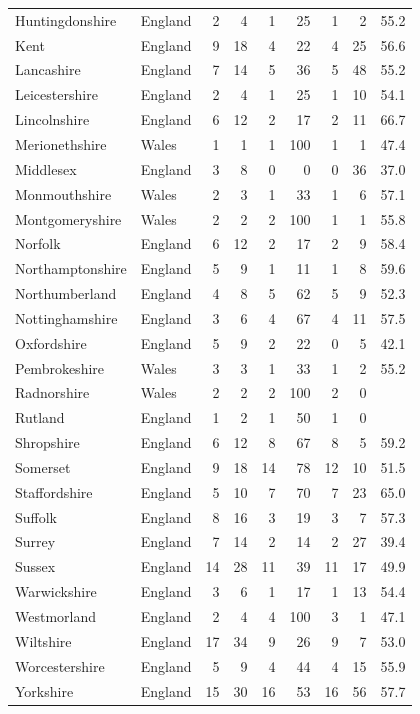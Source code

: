 \documentclass[11pt,a4paper]{article}
\begin{document}
\begin{scriptsize}
\begin{longtable}{llrrrrrrr}
Huntingdonshire & England & 2 & 4 & 1 & 25 & 1 & 2 & 55.2\\
Kent & England & 9 & 18 & 4 & 22 & 4 & 25 & 56.6\\
Lancashire & England & 7 & 14 & 5 & 36 & 5 & 48 & 55.2\\
Leicestershire & England & 2 & 4 & 1 & 25 & 1 & 10 & 54.1\\
Lincolnshire & England & 6 & 12 & 2 & 17 & 2 & 11 & 66.7\\
Merionethshire & Wales & 1 & 1 & 1 & 100 & 1 & 1 & 47.4\\
Middlesex & England & 3 & 8 & 0 & 0 & 0 & 36 & 37.0\\
Monmouthshire & Wales & 2 & 3 & 1 & 33 & 1 & 6 & 57.1\\
Montgomeryshire & Wales & 2 & 2 & 2 & 100 & 1 & 1 & 55.8\\
Norfolk & England & 6 & 12 & 2 & 17 & 2 & 9 & 58.4\\
Northamptonshire & England & 5 & 9 & 1 & 11 & 1 & 8 & 59.6\\
Northumberland & England & 4 & 8 & 5 & 62 & 5 & 9 & 52.3\\
Nottinghamshire & England & 3 & 6 & 4 & 67 & 4 & 11 & 57.5\\
Oxfordshire & England & 5 & 9 & 2 & 22 & 0 & 5 & 42.1\\
Pembrokeshire & Wales & 3 & 3 & 1 & 33 & 1 & 2 & 55.2\\
Radnorshire & Wales & 2 & 2 & 2 & 100 & 2 & 0 & \\
Rutland & England & 1 & 2 & 1 & 50 & 1 & 0 & \\
Shropshire & England & 6 & 12 & 8 & 67 & 8 & 5 & 59.2\\
Somerset & England & 9 & 18 & 14 & 78 & 12 & 10 & 51.5\\
Staffordshire & England & 5 & 10 & 7 & 70 & 7 & 23 & 65.0\\
Suffolk & England & 8 & 16 & 3 & 19 & 3 & 7 & 57.3\\
Surrey & England & 7 & 14 & 2 & 14 & 2 & 27 & 39.4\\
Sussex & England & 14 & 28 & 11 & 39 & 11 & 17 & 49.9\\
Warwickshire & England & 3 & 6 & 1 & 17 & 1 & 13 & 54.4\\
Westmorland & England & 2 & 4 & 4 & 100 & 3 & 1 & 47.1\\
Wiltshire & England & 17 & 34 & 9 & 26 & 9 & 7 & 53.0\\
Worcestershire & England & 5 & 9 & 4 & 44 & 4 & 15 & 55.9\\
Yorkshire & England & 15 & 30 & 16 & 53 & 16 & 56 & 57.7\\
\bottomrule\end{longtable}\end{scriptsize}
\end{document}
